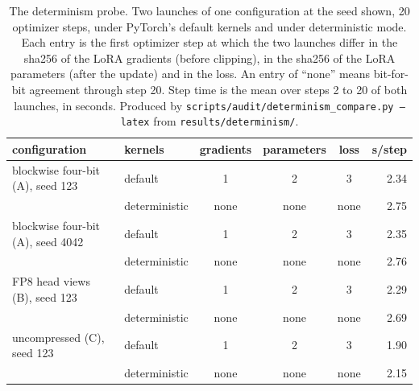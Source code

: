\documentclass[11pt,letterpaper]{article}
\begin{document}
\begin{table}[htbp]
\centering
\small
\caption{The determinism probe. Two launches of one configuration at the seed shown, 20 optimizer steps, under PyTorch's default kernels and under deterministic mode. Each entry is the first optimizer step at which the two launches differ in the sha256 of the LoRA gradients (before clipping), in the sha256 of the LoRA parameters (after the update) and in the loss. An entry of ``none'' means bit-for-bit agreement through step 20. Step time is the mean over steps 2 to 20 of both launches, in seconds. Produced by \texttt{scripts/audit/determinism\_compare.py --latex} from \texttt{results/determinism/}.}
\label{tab:determinism}
\begin{tabular}{llcccr}
\toprule
configuration & kernels & gradients & parameters & loss & s/step \\
\midrule
blockwise four-bit (A), seed 123 & default & 1 & 2 & 3 & 2.34 \\
 & deterministic & none & none & none & 2.75 \\
blockwise four-bit (A), seed 4042 & default & 1 & 2 & 3 & 2.35 \\
 & deterministic & none & none & none & 2.76 \\
FP8 head views (B), seed 123 & default & 1 & 2 & 3 & 2.29 \\
 & deterministic & none & none & none & 2.69 \\
uncompressed (C), seed 123 & default & 1 & 2 & 3 & 1.90 \\
 & deterministic & none & none & none & 2.15 \\
\bottomrule
\end{tabular}
\end{table}
\end{document}
